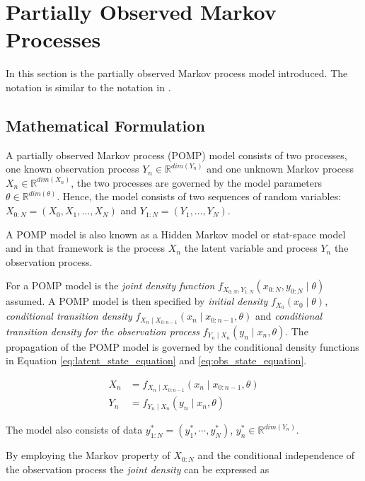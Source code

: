 \documentclass[twoside,openright]{report}
\begin{document}
\section{Partially Observed Markov Processes}
In this section is the partially observed Markov process model introduced. The notation is similar to the notation in \cite{ionides2015inference}.

\subsection{Mathematical Formulation}
A partially observed Markov process (POMP) model consists of two processes, one known observation process $Y_n \in \mathbb{R}^{dim(Y_n)}$ and one unknown Markov process $X_n \in \mathbb{R} ^{dim(X_n)}$, the two processes are governed by the model parameters $\theta \in \mathbb{R}^{dim(\theta)}$.  Hence, the model consists of two sequences of random variables: $X_{0:N} = (X_0, X_1, \ldots , X_N)$ and $Y_{1:N} = (Y_1, \ldots , Y_N )$. 

A POMP model is also known as a Hidden Markov model or stat-space model and in that framework is the process $X_n$ the latent variable and process $Y_n$ the observation process.

For a POMP model is the \textit{joint density function} $f_{X_{0:N}, Y_{1:N}}(x_{0:N}, y_{0:N} \mid \theta)$ assumed. A POMP model is then specified by \textit{initial density} $f_{X_0}(x_0 \mid \theta)$, \textit{conditional transition density} $f_{X_n \mid X_{0:n-1}}(x_n \mid x_{0:n-1}, \theta)$ and \textit{conditional transition density for the observation process} $f_{Y_n \mid X_{n}}(y_n \mid x_{n}, \theta)$. The propagation of the POMP model is governed by the conditional density functions in Equation \ref{eq:latent_state_equation} and \ref{eq:obs_state_equation}. 

\begin{align}
    X_n &= f_{X_n \mid X_{0:n-1}}(x_n \mid x_{0:n-1}, \theta) \label{eq:latent_state_equation} \\
    Y_n &= f_{Y_n \mid X_{n}}(y_n \mid x_{n}, \theta) \label{eq:obs_state_equation}
\end{align}

The model also consists of data $y_{1:N}^{\ast} = (y_1^{\ast}, \cdots , y_{N}^{\ast}) $, $y_{n}^{\ast} \in \mathbb{R}^{dim(Y_n)}$.

By employing the Markov property of $X_{0:N}$ and the conditional independence of the observation process the \textit{joint density} can be expressed as
\end{document}
